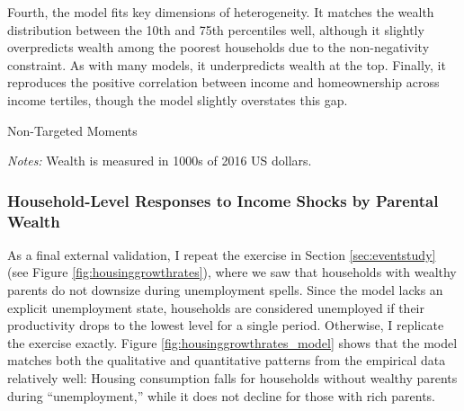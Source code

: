\documentclass[12pt]{article}
\begin{document}
Fourth, the model fits key dimensions of heterogeneity. It matches the wealth distribution between the 10th and 75th percentiles well, although it slightly overpredicts wealth among the poorest households due to the non-negativity constraint. As with many models, it underpredicts wealth at the top. Finally, it reproduces the positive correlation between income and homeownership across income tertiles, though the model slightly overstates this gap.

\begin{table}
	\begin{adjustbox}{center}
	\begin{threeparttable}
	\caption{Non-Targeted Moments}\label{tab:nontargeted}
	
	\footnotesize 
	\textit{Notes:} Wealth is measured in 1000s of 2016 US dollars.
	\end{threeparttable}
\end{adjustbox}
	\end{table}

\subsubsection{Household-Level Responses to Income Shocks by Parental Wealth}
As a final external validation, I repeat the exercise in Section \ref{sec:eventstudy} (see Figure \ref{fig:housinggrowthrates}), where we saw that households with wealthy parents do not downsize during unemployment spells. Since the model lacks an explicit unemployment state, households are considered unemployed if their productivity drops to the lowest level for a single period. Otherwise, I replicate the exercise exactly. Figure \ref{fig:housinggrowthrates_model} shows that the model matches both the qualitative and quantitative patterns from the empirical data relatively well: Housing consumption falls for households without wealthy parents during ``unemployment,'' while it does not decline for those with rich parents. 
\end{document}
